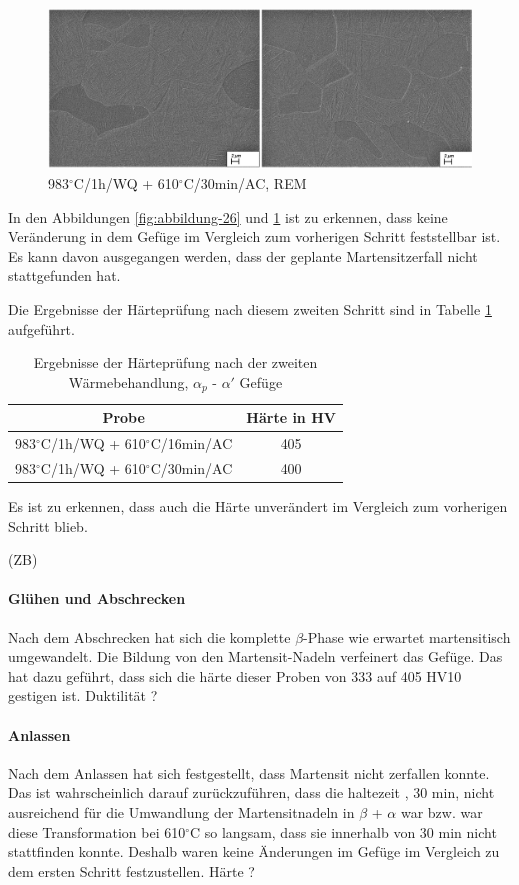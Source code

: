 \begin{figure}
	\centering
	\includegraphics[width=1.0\linewidth]{./Bilder/Abbildung 27.png}
	\caption[Abbildung 27]{983$^\circ$C/1h/WQ + 610$^\circ$C/30min/AC, REM}
	\label{fig:abbildung-27}
\end{figure}

\pagebreak

In den Abbildungen \ref{fig:abbildung-26} und \ref{fig:abbildung-27} ist zu erkennen, dass keine Veränderung in dem Gefüge im Vergleich zum vorherigen Schritt feststellbar ist. Es kann davon ausgegangen werden, dass der geplante Martensitzerfall nicht stattgefunden hat.

Die Ergebnisse der Härteprüfung nach diesem zweiten Schritt sind in Tabelle \ref{Tabelle 9} aufgeführt.

\begin{table}[h]
	\centering
	\begin{tabular}{|c|c|}
		\hline 
		Probe & Härte in HV \\ 
		\hline 
		983$^\circ$C/1h/WQ + 610$^\circ$C/16min/AC & 405 \\ 
		\hline 
		983$^\circ$C/1h/WQ + 610$^\circ$C/30min/AC & 400 \\ 
		\hline 
	\end{tabular} 
	\caption{Ergebnisse der Härteprüfung nach der zweiten Wärmebehandlung, $\alpha_p$ - $\alpha'$ Gefüge}
	\label{Tabelle 9}
\end{table}

Es ist zu erkennen, dass auch die Härte unverändert im Vergleich zum vorherigen Schritt blieb.

(ZB)

\paragraph{Glühen und Abschrecken}
Nach dem Abschrecken hat sich die komplette $\beta$-Phase wie erwartet martensitisch umgewandelt. Die Bildung von den Martensit-Nadeln verfeinert das Gefüge. Das hat dazu geführt, dass sich die härte dieser Proben von 333 auf 405 HV10 gestigen ist. Duktilität ?
\paragraph{Anlassen} Nach dem Anlassen hat sich festgestellt, dass Martensit nicht zerfallen konnte. Das ist wahrscheinlich darauf zurückzuführen, dass die haltezeit , 30 min, nicht ausreichend für die Umwandlung der Martensitnadeln in  $\beta$ + $\alpha$ war bzw. war diese Transformation bei 610$^\circ$C so langsam, dass sie innerhalb von 30 min nicht stattfinden konnte.
Deshalb waren keine Änderungen im Gefüge im Vergleich zu dem ersten Schritt  festzustellen. Härte ?

